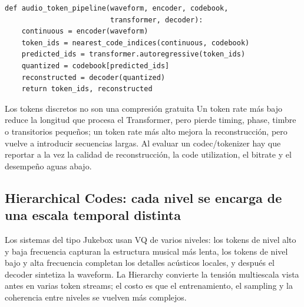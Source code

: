 

\begin{lstlisting}[caption={Flujo conceptual del modelado con audio-tokens discretos.}]
def audio_token_pipeline(waveform, encoder, codebook,
                         transformer, decoder):
    continuous = encoder(waveform)
    token_ids = nearest_code_indices(continuous, codebook)
    predicted_ids = transformer.autoregressive(token_ids)
    quantized = codebook[predicted_ids]
    reconstructed = decoder(quantized)
    return token_ids, reconstructed
\end{lstlisting}

\begin{warningbox}{Los tokens discretos no son una compresión gratuita}
Un token rate más bajo reduce la longitud que procesa el Transformer, pero pierde timing, phase, timbre o transitorios pequeños; un token rate más alto mejora la reconstrucción, pero vuelve a introducir secuencias largas. Al evaluar un codec/tokenizer hay que reportar a la vez la calidad de reconstrucción, la code utilization, el bitrate y el desempeño aguas abajo.
\end{warningbox}

\subsection{Hierarchical Codes: cada nivel se encarga de una escala temporal distinta}

Los sistemas del tipo Jukebox usan VQ de varios niveles: los tokens de nivel alto y baja frecuencia capturan la estructura musical más lenta, los tokens de nivel bajo y alta frecuencia completan los detalles acústicos locales, y después el decoder sintetiza la waveform. La Hierarchy convierte la tensión multiescala vista antes en varias token streams; el costo es que el entrenamiento, el sampling y la coherencia entre niveles se vuelven más complejos.


